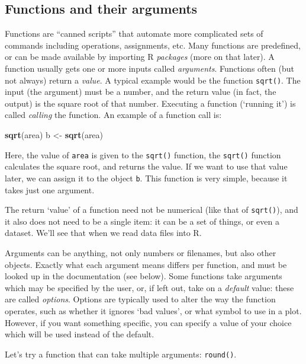 \documentclass[]{book}
\newenvironment{Shaded}{\begin{snugshade}}{\end{snugshade}}
\newcommand{\KeywordTok}[1]{\textcolor[rgb]{0.13,0.29,0.53}{\textbf{#1}}}
\newcommand{\StringTok}[1]{\textcolor[rgb]{0.31,0.60,0.02}{#1}}
\newcommand{\NormalTok}[1]{#1}
\begin{document}
\subsection{Functions and their
arguments}\label{functions-and-their-arguments}

Functions are ``canned scripts'' that automate more complicated sets of
commands including operations, assignments, etc. Many functions are
predefined, or can be made available by importing R \emph{packages}
(more on that later). A function usually gets one or more inputs called
\emph{arguments}. Functions often (but not always) return a
\emph{value}. A typical example would be the function \texttt{sqrt()}.
The input (the argument) must be a number, and the return value (in
fact, the output) is the square root of that number. Executing a
function (`running it') is called \emph{calling} the function. An
example of a function call is:

\begin{Shaded}
\begin{Highlighting}[]
\KeywordTok{sqrt}\NormalTok{(area)}
\NormalTok{b <-}\StringTok{ }\KeywordTok{sqrt}\NormalTok{(area)}
\end{Highlighting}
\end{Shaded}

Here, the value of \texttt{area} is given to the \texttt{sqrt()}
function, the \texttt{sqrt()} function calculates the square root, and
returns the value. If we want to use that value later, we can assign it
to the object \texttt{b}. This function is very simple, because it takes
just one argument.

The return `value' of a function need not be numerical (like that of
\texttt{sqrt()}), and it also does not need to be a single item: it can
be a set of things, or even a dataset. We'll see that when we read data
files into R.

Arguments can be anything, not only numbers or filenames, but also other
objects. Exactly what each argument means differs per function, and must
be looked up in the documentation (see below). Some functions take
arguments which may be specified by the user, or, if left out, take on a
\emph{default} value: these are called \emph{options}. Options are
typically used to alter the way the function operates, such as whether
it ignores `bad values', or what symbol to use in a plot. However, if
you want something specific, you can specify a value of your choice
which will be used instead of the default.

Let's try a function that can take multiple arguments: \texttt{round()}.
\end{document}
